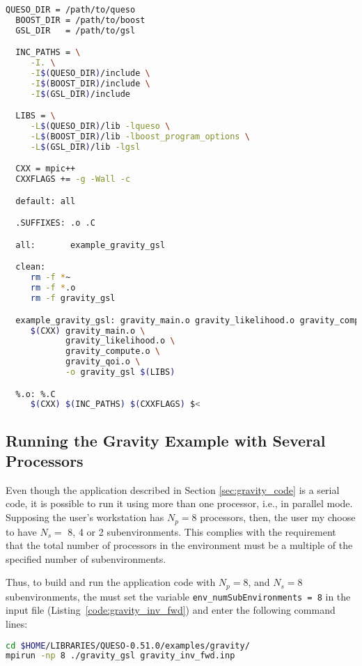 \begin{lstlisting}[caption={Makefile for the application code in Listings
  \ref{code:gravity_main}-\ref{code:gravity_like_C}},
  label={code:makefile},
  language={bash}]
  QUESO_DIR = /path/to/queso
  BOOST_DIR = /path/to/boost
  GSL_DIR   = /path/to/gsl

  INC_PATHS = \
     -I. \
     -I$(QUESO_DIR)/include \
     -I$(BOOST_DIR)/include \
     -I$(GSL_DIR)/include

  LIBS = \
     -L$(QUESO_DIR)/lib -lqueso \
     -L$(BOOST_DIR)/lib -lboost_program_options \
     -L$(GSL_DIR)/lib -lgsl

  CXX = mpic++
  CXXFLAGS += -g -Wall -c

  default: all

  .SUFFIXES: .o .C

  all:       example_gravity_gsl

  clean:
     rm -f *~
     rm -f *.o
     rm -f gravity_gsl

  example_gravity_gsl: gravity_main.o gravity_likelihood.o gravity_compute.o gravity_qoi.o
     $(CXX) gravity_main.o \
            gravity_likelihood.o \
            gravity_compute.o \
            gravity_qoi.o \
            -o gravity_gsl $(LIBS)

  %.o: %.C
     $(CXX) $(INC_PATHS) $(CXXFLAGS) $<
\end{lstlisting}

\subsection{Running the Gravity Example with Several Processors}

Even though the application described in Section \ref{sec:gravity_code} is a serial code, it is 
possible to run it using more than one processor, i.e., in parallel mode. 
Supposing the user's workstation has $N_p=8$ processors, then, the user my choose to have $N_s =$ 
8, 4 or 2 subenvironments. This complies with the requirement that the total number of processors 
in the environment must be a multiple of the specified number of subenvironments.

Thus, to build and run the application code with $N_p = 8$, and $N_s=8$ subenvironments, the must 
set the variable \texttt{env\_numSubEnvironments = 8} in the input file 
(Listing~\ref{code:gravity_inv_fwd}) and enter the following command lines: 



\begin{lstlisting}[caption={}, label={},language={bash}]
cd $HOME/LIBRARIES/QUESO-0.51.0/examples/gravity/
mpirun -np 8 ./gravity_gsl gravity_inv_fwd.inp
\end{lstlisting}


